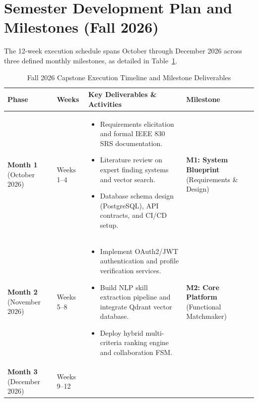 \documentclass[11pt,a4paper]{article}
\begin{document}
\section{Semester Development Plan and Milestones (Fall 2026)}

The 12-week execution schedule spans October through December 2026 across three defined monthly milestones, as detailed in Table~\ref{tab:timeline}.

\begin{table}[H]
\centering
\small
\caption{Fall 2026 Capstone Execution Timeline and Milestone Deliverables}
\label{tab:timeline}
\begin{tabularx}{\textwidth}{@{}p{2.4cm} p{1.8cm} X p{3.2cm}@{}}
\toprule
\textbf{Phase} & \textbf{Weeks} & \textbf{Key Deliverables \& Activities} & \textbf{Milestone} \\
\midrule
\textbf{Month 1} \newline (October 2026) & Weeks 1--4 & 
\begin{itemize}[leftmargin=*,noitemsep]
    \item Requirements elicitation and formal IEEE 830 SRS documentation.
    \item Literature review on expert finding systems and vector search.
    \item Database schema design (PostgreSQL), API contracts, and CI/CD setup.
\end{itemize} & \textbf{M1: System Blueprint} \newline (Requirements \& Design) \\
\addlinespace
\textbf{Month 2} \newline (November 2026) & Weeks 5--8 & 
\begin{itemize}[leftmargin=*,noitemsep]
    \item Implement OAuth2/JWT authentication and profile verification services.
    \item Build NLP skill extraction pipeline and integrate Qdrant vector database.
    \item Deploy hybrid multi-criteria ranking engine and collaboration FSM.
\end{itemize} & \textbf{M2: Core Platform} \newline (Functional Matchmaker) \\
\addlinespace
\textbf{Month 3} \newline (December 2026) & Weeks 9--12 & 

\end{tabularx}
\end{table}
\end{document}
